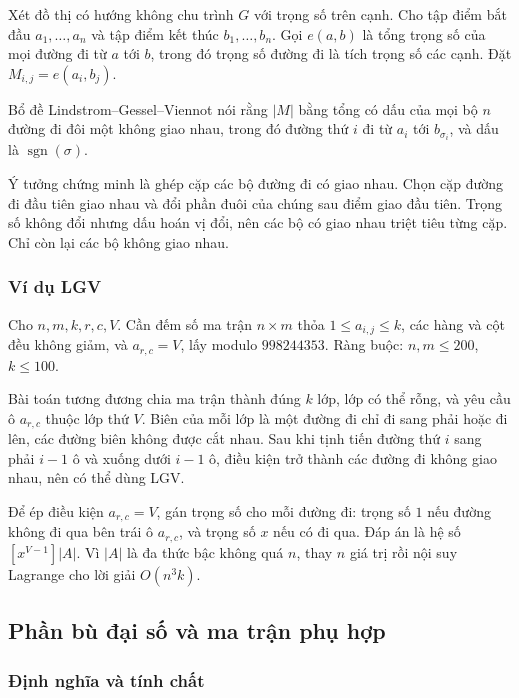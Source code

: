\documentclass[11pt]{article}
\begin{document}
Xét đồ thị có hướng không chu trình \(G\) với trọng số trên cạnh. Cho tập điểm
bắt đầu \(a_1,\ldots,a_n\) và tập điểm kết thúc \(b_1,\ldots,b_n\). Gọi
\(e(a,b)\) là tổng trọng số của mọi đường đi từ \(a\) tới \(b\), trong đó trọng
số đường đi là tích trọng số các cạnh. Đặt \(M_{i,j}=e(a_i,b_j)\).

Bổ đề Lindstrom--Gessel--Viennot nói rằng \(|M|\) bằng tổng có dấu của mọi bộ
\(n\) đường đi đôi một không giao nhau, trong đó đường thứ \(i\) đi từ \(a_i\)
tới \(b_{\sigma_i}\), và dấu là \(\operatorname{sgn}(\sigma)\).

Ý tưởng chứng minh là ghép cặp các bộ đường đi có giao nhau. Chọn cặp đường đi
đầu tiên giao nhau và đổi phần đuôi của chúng sau điểm giao đầu tiên. Trọng số
không đổi nhưng dấu hoán vị đổi, nên các bộ có giao nhau triệt tiêu từng cặp.
Chỉ còn lại các bộ không giao nhau.

\subsubsection{Ví dụ LGV}

Cho \(n,m,k,r,c,V\). Cần đếm số ma trận \(n\times m\) thỏa
\(1\le a_{i,j}\le k\), các hàng và cột đều không giảm, và \(a_{r,c}=V\), lấy
modulo \(998244353\). Ràng buộc: \(n,m\le 200\), \(k\le 100\).

Bài toán tương đương chia ma trận thành đúng \(k\) lớp, lớp có thể rỗng, và yêu
cầu ô \(a_{r,c}\) thuộc lớp thứ \(V\). Biên của mỗi lớp là một đường đi chỉ đi
sang phải hoặc đi lên, các đường biên không được cắt nhau. Sau khi tịnh tiến
đường thứ \(i\) sang phải \(i-1\) ô và xuống dưới \(i-1\) ô, điều kiện trở
thành các đường đi không giao nhau, nên có thể dùng LGV.

Để ép điều kiện \(a_{r,c}=V\), gán trọng số cho mỗi đường đi: trọng số \(1\)
nếu đường không đi qua bên trái ô \(a_{r,c}\), và trọng số \(x\) nếu có đi qua.
Đáp án là hệ số \([x^{V-1}]|A|\). Vì \(|A|\) là đa thức bậc không quá \(n\),
thay \(n\) giá trị rồi nội suy Lagrange cho lời giải \(O(n^3k)\).

\subsection{Phần bù đại số và ma trận phụ hợp}

\subsubsection{Định nghĩa và tính chất}
\end{document}
